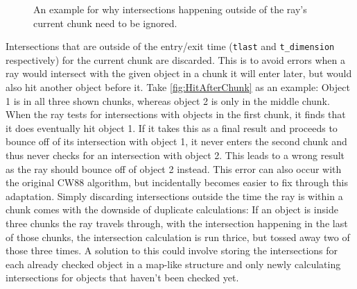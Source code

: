 \begin{figure}[b!]
    
    \caption[Demonstration of why only intersections inside a chunk are counted]{An example for why intersections happening outside of the ray's current chunk need to be ignored.}\label{fig:HitAfterChunk}
\end{figure}
Intersections that are outside of the entry/exit time (\verb|tlast| and \verb|t_dimension| respectively) for the current chunk are discarded.
This is to avoid errors when a ray would intersect with the given object in a chunk it will enter later,
but would also hit another object before it.
Take \autoref{fig:HitAfterChunk} as an example:
Object 1 is in all three shown chunks, whereas object 2 is only in the middle chunk.
When the ray tests for intersections with objects in the first chunk,
it finds that it does eventually hit object 1.
If it takes this as a final result and proceeds to bounce off of its intersection with object 1,
it never enters the second chunk and thus never checks for an intersection with object 2.
This leads to a wrong result as the ray should bounce off of object 2 instead.
This error can also occur with the original CW88 algorithm,
but incidentally becomes easier to fix through this adaptation.
\newline
Simply discarding intersections outside the time the ray is within a chunk comes with the downside of duplicate calculations:
If an object is inside three chunks the ray travels through, with the intersection happening in the last of those chunks,
the intersection calculation is run thrice, but tossed away two of those three times.
\newline
A solution to this could involve storing the intersections for each already checked object in a map-like structure
and only newly calculating intersections for objects that haven't been checked yet.
